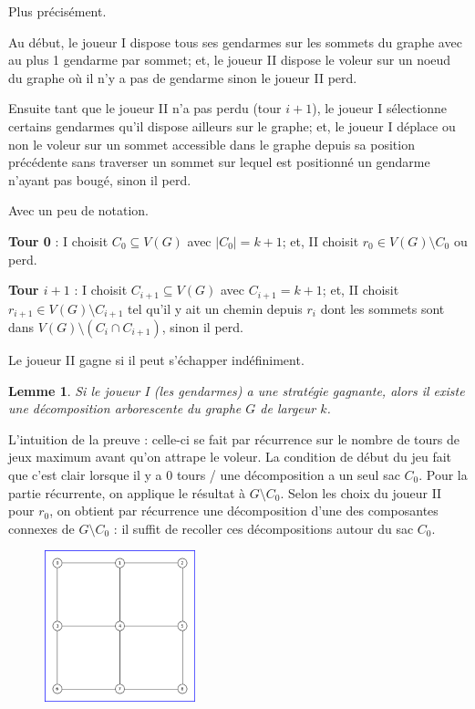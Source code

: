 \documentclass[a4paper,12pt]{article}
\newtheorem{lemma}[theorem]{Lemme}
\theoremstyle{definition}
\theoremstyle{remark}
\begin{document}
Plus précisément.
\begin{compactitem}
\item 
  Au début, le joueur I dispose tous ses gendarmes sur
  les sommets du graphe avec au plus 1 gendarme par sommet; et, le joueur II dispose le voleur sur un
  noeud du graphe où il n'y a pas de gendarme sinon le joueur II perd.
\item 
  Ensuite tant que le joueur II n'a pas perdu (tour $i+1$), 
  le joueur I sélectionne certains gendarmes qu'il dispose ailleurs sur le
  graphe; et, le joueur I déplace ou
  non le voleur sur un sommet accessible dans le graphe depuis sa position
  précédente sans traverser un sommet sur lequel est positionné un
  gendarme n'ayant pas bougé, sinon il perd.
\end{compactitem}

Avec un peu de notation.
\begin{compactitem}
\item \textbf{Tour 0} : I choisit $C_0\subseteq V(G)$ avec $|C_0|=k+1$;
  et, II choisit $r_0 \in V(G) \setminus C_0$ ou perd.
\item \textbf{Tour $i+1$} : I choisit $C_{i+1}\subseteq V(G)$ avec
  $C_{i+1}=k+1$; et, II choisit $r_{i+1} \in V(G)\setminus C_{i+1}$ tel qu'il y ait un
  chemin depuis $r_i$ dont les sommets sont dans $V(G)\setminus (C_i
  \cap C_{i+1})$, sinon il perd.
\end{compactitem}

Le joueur II gagne si il peut s'échapper indéfiniment. 

\begin{lemma}
  Si le joueur I (les gendarmes) a une stratégie gagnante, alors il
  existe une décomposition arborescente du graphe $G$ de largeur $k$.
\end{lemma}
L'intuition de la preuve : celle-ci se fait par récurrence sur le nombre de tours de
jeux maximum avant qu'on attrape le voleur. La condition de début du
jeu fait que c'est clair lorsque il y a 0 tours / une décomposition a
un seul sac $C_0$. Pour la partie récurrente, on applique le résultat à $G\setminus
C_0$. Selon les choix du joueur II pour $r_0$, on obtient par récurrence une
décomposition d'une des composantes connexes de $G\setminus
C_0$ : il suffit de recoller ces décompositions autour du sac $C_0$.

\begin{figure}
  \vspace{-30pt}
  \begin{center}
    \includegraphics[width=0.39\textwidth]{dessins/DevoirExo3JeuGrille3x3.png}
  \end{center}
  \vspace{-30pt}
\end{figure}
\end{document}
